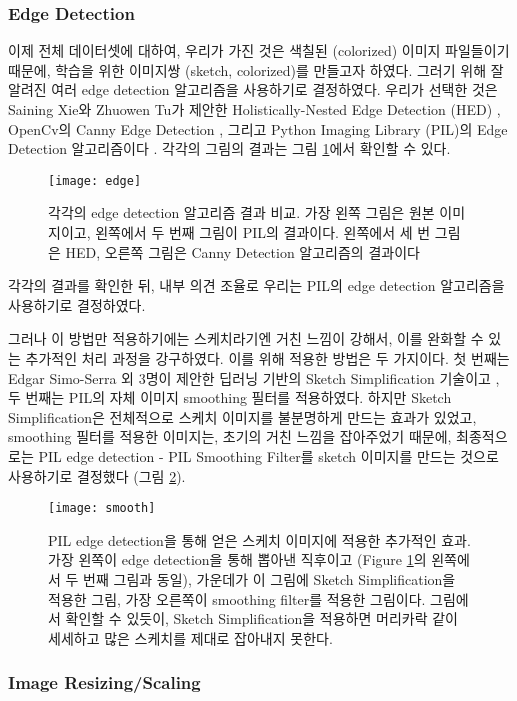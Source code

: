 \subsubsection{Edge Detection}

이제 전체 데이터셋에 대하여, 우리가 가진 것은 색칠된 (colorized) 이미지 파일들이기 때문에, 학습을 위한 이미지쌍 (sketch, colorized)를 만들고자 하였다. 그러기 위해 잘 알려진 여러 edge detection 알고리즘을 사용하기로 결정하였다.
우리가 선택한 것은 Saining Xie와 Zhuowen Tu가 제안한 Holistically-Nested Edge Detection (HED) \cite{Saining2015}, OpenCv의 Canny Edge Detection \cite{opencv}, 그리고 Python Imaging Library (PIL)의 Edge Detection 알고리즘이다 \cite{pillow}. 각각의 그림의 결과는 그림 \ref{fig:edge_detection}에서 확인할 수 있다.
\begin{figure}[t]
	\centering
	\texttt{[image: edge]}
	\caption{각각의 edge detection 알고리즘 결과 비교. 가장 왼쪽 그림은 원본 이미지이고, 왼쪽에서 두 번째 그림이 PIL의 결과이다. 왼쪽에서 세 번 그림은 HED, 오른쪽 그림은 Canny Detection 알고리즘의 결과이다}
	\label{fig:edge_detection}
\end{figure}
각각의 결과를 확인한 뒤, 내부 의견 조율로 우리는 PIL의 edge detection 알고리즘을 사용하기로 결정하였다. 

그러나 이 방법만 적용하기에는 스케치라기엔 거친 느낌이 강해서, 이를 완화할 수 있는 추가적인 처리 과정을 강구하였다.
이를 위해 적용한 방법은 두 가지이다.
첫 번째는 Edgar Simo-Serra 외 3명이 제안한 딥러닝 기반의 Sketch Simplification 기술이고 \cite{SimoSerraTOG2018}, 두 번째는 PIL의 자체 이미지 smoothing 필터를 적용하였다.
하지만 Sketch Simplification은 전체적으로 스케치 이미지를 불분명하게 만드는 효과가 있었고, smoothing 필터를 적용한 이미지는, 초기의 거친 느낌을 잡아주었기 때문에, 최종적으로는 PIL edge detection - PIL Smoothing Filter를 sketch 이미지를 만드는 것으로 사용하기로 결정했다 (그림 \ref{fig:edge_smooth}).
\begin{figure}[t]
	\centering
	\texttt{[image: smooth]}
	\caption{PIL edge detection을 통해 얻은 스케치 이미지에 적용한 추가적인 효과. 가장 왼쪽이 edge detection을 통해 뽑아낸 직후이고 (Figure \ref{fig:edge_detection}의 왼쪽에서 두 번째 그림과 동일), 가운데가 이 그림에 Sketch Simplification을 적용한 그림, 가장 오른쪽이 smoothing filter를 적용한 그림이다. 그림에서 확인할 수 있듯이, Sketch Simplification을 적용하면 머리카락 같이 세세하고 많은 스케치를 제대로 잡아내지 못한다.}
	\label{fig:edge_smooth}
\end{figure}

\subsubsection{Image Resizing/Scaling}

